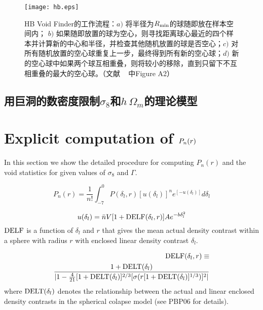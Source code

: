 \begin{figure}
\centering
\texttt{[image: hb.eps]}
\caption{HB Void Finder的工作流程：$a)$ 将半径为$R_{\rm min}$的球随即放在样本空间内；
$b)$ 如果随即放置的球为空心，则寻找距离球心最近的四个样本并计算新的中心和半径，并检查其他随机放置的球是否空心；$c)$ 对所有随机放置的空心球重复上一步，最终得到所有新的空心球；$d)$ 新的空心球中如果两个球互相重叠，则将较小的移除，直到只留下不互相重叠的最大的空心球。（文献 ~ 中Figure A2）}
\label{fig:hb}
\end{figure}

\subsection{用巨洞的数密度限制$\sigma_8$和$h\, \Omega_m$的理论模型}


\section{Explicit computation of $P_{\lowercase{n}}(\lowercase{r})$}

In this section we show the detailed procedure for computing $P_n(r)$ and the void statistics for given values of $\sigma_8$ and $\Gamma$.

\begin{equation}
P_n(r) = \frac{1}{n!} \int_{-7}^{0} P(\delta_l,r) [u(\delta_l)]^n e^{[-u(\delta_l)]} d\delta_l   \label{eq:eqA1}
\end{equation}

\begin{equation}
u(\delta_l) = \bar{n} V [1+{\rm DELF}(\delta_l,r)] A e^{-b\delta_l^2}    \label{eq:eqA2}
\end{equation}
${\rm DELF}$ is a function of $\delta_l$ and $r$ that gives the mean actual density contrast within a sphere with radius $r$ with enclosed 
linear density contrast $\delta_l$.

\begin{eqnarray}
{\rm DELF}(\delta_l,r) \equiv & \nonumber\\
 \frac{1+{\rm DELT}(\delta_l)}{| 1 - \frac{4}{21}[1+{\rm DELT}(\delta_l)]^{2/3}[\sigma(r[1+{\rm DELT}(\delta_l)]^{1/3})]^{2} |} &    \label{eq:eqA3}
\end{eqnarray}
where ${\rm DELT}(\delta_l)$ denotes the relationship between the actual and linear enclosed density contrasts in the spherical colapse model 
(see PBP06 for details).

